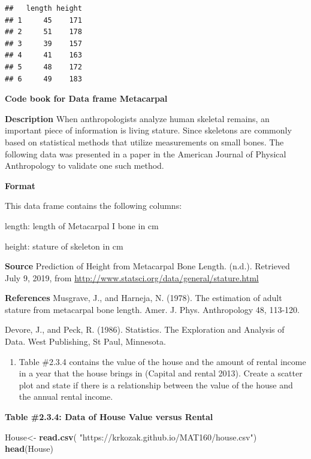 \documentclass[
]{book}
\newenvironment{Shaded}{\begin{snugshade}}{\end{snugshade}}
\newcommand{\KeywordTok}[1]{\textcolor[rgb]{0.13,0.29,0.53}{\textbf{#1}}}
\newcommand{\NormalTok}[1]{#1}
\newcommand{\StringTok}[1]{\textcolor[rgb]{0.31,0.60,0.02}{#1}}
\providecommand{\tightlist}{%
  \setlength{\itemsep}{0pt}\setlength{\parskip}{0pt}}
\begin{document}
\begin{verbatim}
##   length height
## 1     45    171
## 2     51    178
## 3     39    157
## 4     41    163
## 5     48    172
## 6     49    183
\end{verbatim}

\textbf{Code book for Data frame Metacarpal}

\textbf{Description}
When anthropologists analyze human skeletal remains, an important piece of information is living stature. Since skeletons are commonly based on statistical methods that utilize measurements on small bones. The following data was presented in a paper in the American Journal of Physical Anthropology to validate one such method.

\textbf{Format}

This data frame contains the following columns:

length: length of Metacarpal I bone in cm

height: stature of skeleton in cm

\textbf{Source}
Prediction of Height from Metacarpal Bone Length. (n.d.). Retrieved July 9, 2019, from \url{http://www.statsci.org/data/general/stature.html}

\textbf{References}
Musgrave, J., and Harneja, N. (1978). The estimation of adult stature from metacarpal bone length. Amer. J. Phys. Anthropology 48, 113-120.

Devore, J., and Peck, R. (1986). Statistics. The Exploration and Analysis of Data. West Publishing, St Paul, Minnesota.

\begin{enumerate}
\def\labelenumi{\arabic{enumi}.}
\setcounter{enumi}{1}
\tightlist
\item
  Table \#2.3.4 contains the value of the house and the amount of rental income in a year that the house brings in (Capital and rental 2013). Create a scatter plot and state if there is a relationship between the value of the house and the annual rental income.
\end{enumerate}

\textbf{Table \#2.3.4: Data of House Value versus Rental}

\begin{Shaded}
\begin{Highlighting}[]
\NormalTok{House<-}\StringTok{ }\KeywordTok{read.csv}\NormalTok{(}
  \StringTok{"https://krkozak.github.io/MAT160/house.csv"}\NormalTok{)}
\KeywordTok{head}\NormalTok{(House)}
\end{Highlighting}
\end{Shaded}
\end{document}
